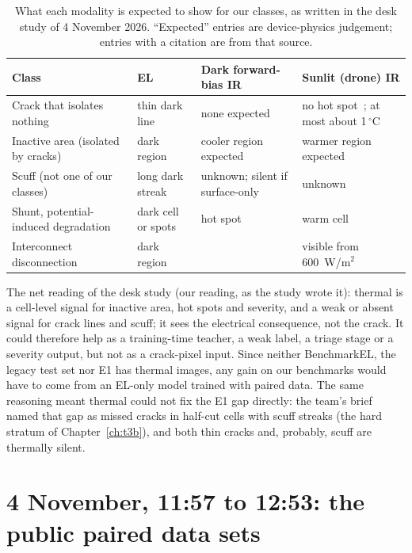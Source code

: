 \begin{table}[htbp]
\centering\small
\caption{What each modality is expected to show for our classes, as written in the desk study of 4 November 2026. ``Expected''
entries are device-physics judgement; entries with a citation are from that source.}
\label{tab:thermal-physics}
\begin{tabular}{@{}p{3.2cm}p{2.3cm}p{3.0cm}p{3.6cm}@{}}
\toprule
Class & EL & Dark forward-bias IR & Sunlit (drone) IR \\
\midrule
Crack that isolates nothing & thin dark line & none expected & no hot spot~\citep{dhimish2021hotspots}; at most about 1\,$^{\circ}$C~\citep{delpradosantamaria2025drone} \\
Inactive area (isolated by cracks) & dark region & cooler region expected & warmer region expected \\
Scuff (not one of our classes) & long dark streak & unknown; silent if surface-only & unknown \\
Shunt, potential-induced degradation & dark cell or spots & hot spot & warm cell \\
Interconnect disconnection & dark region & & visible from 600~W/m$^2$~\citep{delpradosantamaria2025drone} \\
\bottomrule
\end{tabular}
\end{table}

The net reading of the desk study (our reading, as the study wrote it): thermal is a cell-level signal for inactive area, hot spots
and severity, and a weak or absent signal for crack lines and scuff; it sees the electrical consequence, not the crack. It could
therefore help as a training-time teacher, a weak label, a triage stage or a severity output, but not as a crack-pixel input. Since
neither BenchmarkEL, the legacy test set nor E1 has thermal images, any gain on our benchmarks would have to come from an EL-only
model trained with paired data. The same reasoning meant thermal could not fix the E1 gap directly: the team's brief named that gap as
missed cracks in half-cut cells with scuff streaks (the hard stratum of Chapter~\ref{ch:t3b}), and both thin cracks and, probably,
scuff are thermally silent.

\section{4 November, 11:57 to 12:53: the public paired data sets}\label{sec:thermal-data}

